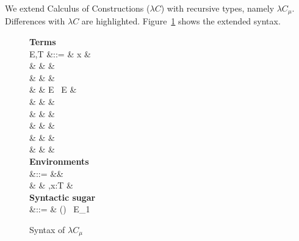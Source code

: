 We extend Calculus of Constructions ($\lambda C$) with recursive
types, namely $\lambda C_{\mu}$. Differences with $\lambda C$ are
highlighted. Figure~\ref{fig:musyn} shows the extended syntax.

\begin{figure}[ht]
  \small
  \begin{syntax}
    \textbf{Terms} \\
    E,T &::= & x &  \\
    & \mid & \star &  \\
    & \mid & \square &  \\
    & \mid & E \ E &  \\
    & \mid &  &  \\
    & \mid &  &  \\
    & \mid &  &  \\
    & \mid &  &  \\
    & \mid &  &  \\
    \textbf{Environments} \\
    \Gamma &::= &\varnothing &  \\
    & \mid & \Gamma,x:T &  \\
    \textbf{Syntactic sugar} \\
     &::= & () \ E_{1}
  \end{syntax}
  \caption{Syntax of $\lambda C_\mu$}\label{fig:musyn}
\end{figure}

